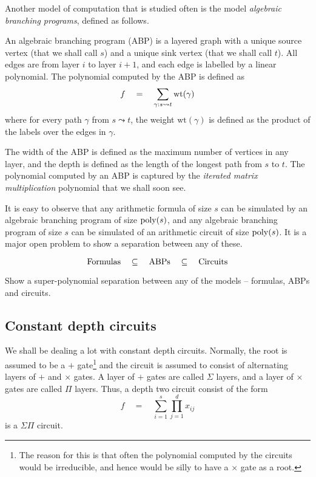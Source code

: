 Another model of computation that is studied often is the model \emph{algebraic branching programs}, defined as follows. 

\begin{definition}\label{defn:ABP}
An algebraic branching program (ABP) is a layered graph with a unique source vertex (that we shall call $s$) and a unique sink vertex (that we shall call $t$). 
All edges are from layer $i$ to layer $i+1$, and each edge is labelled by a linear polynomial. 
The polynomial computed by the ABP is defined as 
\[
f\quad = \quad \sum_{\gamma: s \leadsto t} \mathrm{wt}(\gamma)
\]
where for every path $\gamma$ from $s\leadsto t$, the weight $\mathrm{wt}(\gamma)$ is defined as the product of the labels over the edges in $\gamma$. 
\end{definition}

The width of the ABP is defined as the maximum number of vertices in any layer, and the depth is defined as the length of the longest path from $s$ to $t$. 
The polynomial computed by an ABP is captured by the \emph{iterated matrix multiplication} polynomial that we shall soon see. 

It is easy to observe that any arithmetic formula of size $s$ can be simulated by an algebraic branching program of size $\operatorname{poly}(s)$, and any algebraic branching program of size $s$ can be simulated of an arithmetic circuit of size $\operatorname{poly}(s)$. 
It is a major open problem to show a separation between any of these. 

\[
\mathrm{Formulas} \quad \subseteq \quad \mathrm{ABPs} \quad \subseteq \quad \mathrm{Circuits}
\]

\begin{openproblem}
Show a super-polynomial separation between any of the models -- formulas, ABPs and circuits. 
\end{openproblem}

\subsection{Constant depth circuits}

We shall be dealing a lot with constant depth circuits. 
Normally, the root is assumed to be a $+$ gate\footnote{The reason for this is that often the polynomial computed by the circuits would be irreducible, and hence would be silly to have a $\times$ gate as a root.} and the circuit is assumed to consist of alternating layers of $+$ and $\times$ gates.
A layer of $+$ gates are called $\Sigma$ layers, and a layer of $\times$ gates are called $\Pi$ layers. 
Thus, a depth two circuit consist of the form 
\[
f\quad = \quad \sum_{i=1}^s \prod_{j=1}^d x_{ij}
\]
is a $\Sigma\Pi$ circuit. 

